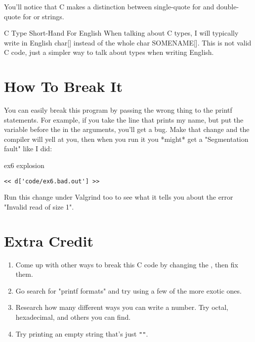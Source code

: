 You'll notice that C makes a distinction between single-quote for 
and double-quote for  or strings.


\begin{aside}{C Type Short-Hand For English}
When talking about C types, I will typically write in English char[] instead of the whole char SOMENAME[].
This is not valid C code, just a simpler way to talk about types when writing English.
\end{aside}

\section{How To Break It}

You can easily break this program by passing the wrong thing to the 
printf statements.  For example, if you take the line that prints
my name, but put the  variable before the 
in the arguments, you'll get a bug.  Make that change and the compiler will
yell at you, then when you run it you *might* get a "Segmentation fault"
like I did:

\begin{code}{ex6 explosion}
\begin{lstlisting}
<< d['code/ex6.bad.out'] >>
\end{lstlisting}
\end{code}

Run this change under Valgrind too to see what it tells you about
the error "Invalid read of size 1".

\section{Extra Credit}

\begin{enumerate}
\item Come up with other ways to break this C code by changing the
    , then fix them.
\item Go search for "printf formats" and try using a few of the
    more exotic ones.
\item Research how many different ways you can write a number. Try
    octal, hexadecimal, and others you can find.
\item Try printing an empty string that's just \verb|""|.
\end{enumerate}

